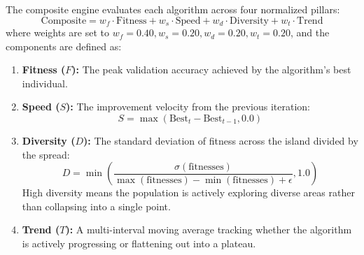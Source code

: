 \documentclass[conference]{IEEEtran}
\begin{document}
The composite engine evaluates each algorithm across four normalized pillars:
\begin{equation}
\text{Composite} = w_f \cdot \text{Fitness} + w_s \cdot \text{Speed} + w_d \cdot \text{Diversity} + w_t \cdot \text{Trend}
\end{equation}
where weights are set to $w_f = 0.40, w_s = 0.20, w_d = 0.20, w_t = 0.20$, and the components are defined as:
\begin{enumerate}
    \item \textbf{Fitness ($F$):} The peak validation accuracy achieved by the algorithm's best individual.
    \item \textbf{Speed ($S$):} The improvement velocity from the previous iteration:
    \begin{equation}
    S = \max(\text{Best}_t - \text{Best}_{t-1}, 0.0)
    \end{equation}
    \item \textbf{Diversity ($D$):} The standard deviation of fitness across the island divided by the spread:
    \begin{equation}
    D = \min\left(\frac{\sigma(\text{fitnesses})}{\max(\text{fitnesses}) - \min(\text{fitnesses}) + \epsilon}, 1.0\right)
    \end{equation}
    High diversity means the population is actively exploring diverse areas rather than collapsing into a single point.
    \item \textbf{Trend ($T$):} A multi-interval moving average tracking whether the algorithm is actively progressing or flattening out into a plateau.
\end{enumerate}
\end{document}
